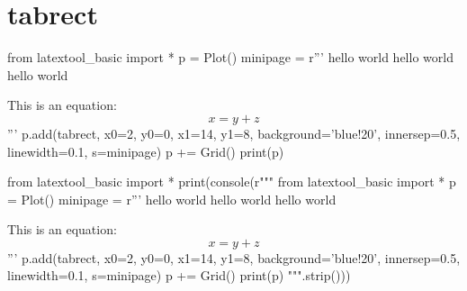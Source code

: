 \section{tabrect}

\begin{python}
from latextool_basic import *
p = Plot()
minipage = r'''
hello world hello world hello world

This is an equation:
\[
x = y + z
\]
'''
p.add(tabrect, x0=2, y0=0, x1=14, y1=8, background='blue!20',
      innersep=0.5, linewidth=0.1, s=minipage)
p += Grid()
print(p)
\end{python}
\begin{python}
from latextool_basic import *
print(console(r"""
from latextool_basic import *
p = Plot()
minipage = r'''
hello world hello world hello world

This is an equation:
\[
x = y + z
\]
'''
p.add(tabrect, x0=2, y0=0, x1=14, y1=8, background='blue!20',
      innersep=0.5, linewidth=0.1, s=minipage)
p += Grid()
print(p)
""".strip()))
\end{python}
